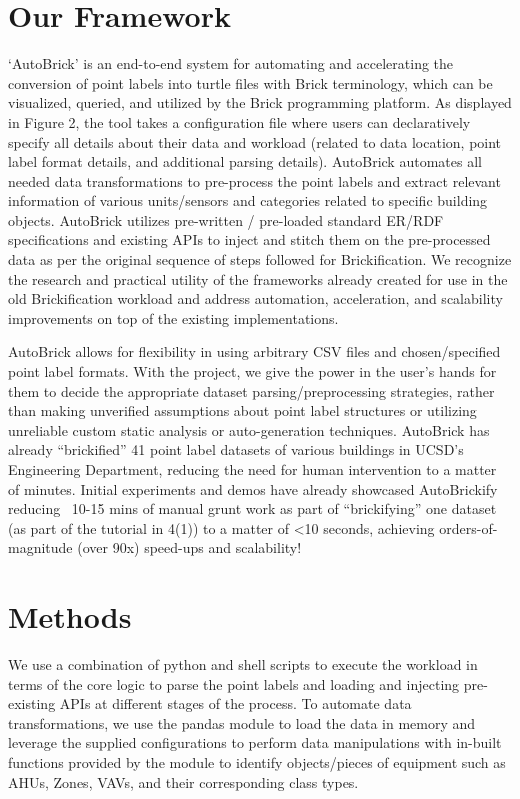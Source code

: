\documentclass[twocolumn, switch]{article} %
\begin{document}
\section{Our Framework}
‘AutoBrick’ is an end-to-end system for automating and accelerating the conversion of point labels into turtle files with Brick terminology, which can be visualized, queried, and utilized by the Brick programming platform. As displayed in Figure 2, the tool takes a configuration file where users can declaratively specify all details about their data and workload (related to data location, point label format details, and additional parsing details). AutoBrick automates all needed data transformations to pre-process the point labels and extract relevant information of various units/sensors and categories related to specific building objects. AutoBrick utilizes pre-written / pre-loaded standard ER/RDF specifications and existing APIs to inject and stitch them on the pre-processed data as per the original sequence of steps followed for Brickification. We recognize the research and practical utility of the frameworks already created for use in the old Brickification workload and address automation, acceleration, and scalability improvements on top of the existing implementations. 

	AutoBrick allows for flexibility in using arbitrary CSV files and chosen/specified point label formats. With the project, we give the power in the user’s hands for them to decide the appropriate dataset parsing/preprocessing strategies, rather than making unverified assumptions about point label structures or utilizing unreliable custom static analysis or auto-generation techniques. AutoBrick has already “brickified” 41 point label datasets of various buildings in UCSD’s Engineering Department, reducing the need for human intervention to a matter of minutes. Initial experiments and demos have already showcased AutoBrickify reducing ~10-15 mins of manual grunt work as part of “brickifying” one dataset (as part of the tutorial in 4(1)) to a matter of <10 seconds, achieving orders-of-magnitude (over 90x) speed-ups and scalability!

\section{Methods}
We use a combination of python and shell scripts to execute the workload in terms of the core logic to parse the point labels and loading and injecting pre-existing APIs at different stages of the process.  
To automate data transformations, we use the pandas module to load the data in memory and leverage the supplied configurations to perform data manipulations with in-built functions provided by the module to identify objects/pieces of equipment such as AHUs, Zones, VAVs, and their corresponding class types. 
\end{document}
